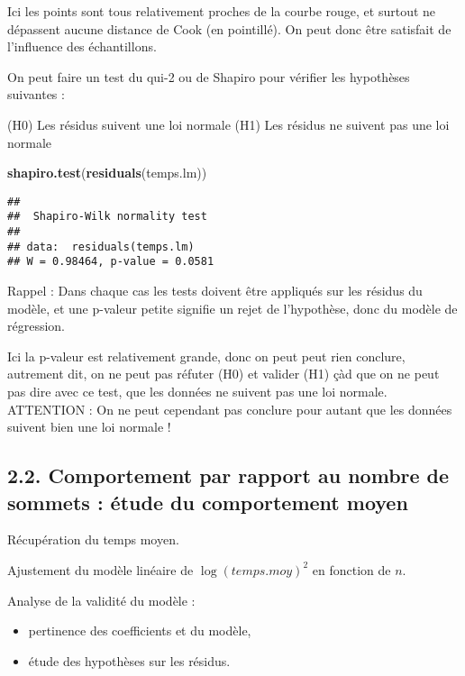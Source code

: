 \documentclass[
]{article}
\newenvironment{Shaded}{\begin{snugshade}}{\end{snugshade}}
\newcommand{\KeywordTok}[1]{\textcolor[rgb]{0.13,0.29,0.53}{\textbf{#1}}}
\newcommand{\NormalTok}[1]{#1}
\begin{document}
Ici les points sont tous relativement proches de la courbe rouge, et
surtout ne dépassent aucune distance de Cook (en pointillé). On peut
donc être satisfait de l'influence des échantillons.

On peut faire un test du qui-2 ou de Shapiro pour vérifier les
hypothèses suivantes :

(H0) Les résidus suivent une loi normale (H1) Les résidus ne suivent pas
une loi normale

\begin{Shaded}
\begin{Highlighting}[]
\KeywordTok{shapiro.test}\NormalTok{(}\KeywordTok{residuals}\NormalTok{(temps.lm))}
\end{Highlighting}
\end{Shaded}

\begin{verbatim}
## 
##  Shapiro-Wilk normality test
## 
## data:  residuals(temps.lm)
## W = 0.98464, p-value = 0.0581
\end{verbatim}

Rappel : Dans chaque cas les tests doivent être appliqués sur les
résidus du modèle, et une p-valeur petite signifie un rejet de
l'hypothèse, donc du modèle de régression.

Ici la p-valeur est relativement grande, donc on peut peut rien
conclure, autrement dit, on ne peut pas réfuter (H0) et valider (H1) çàd
que on ne peut pas dire avec ce test, que les données ne suivent pas une
loi normale. ATTENTION : On ne peut cependant pas conclure pour autant
que les données suivent bien une loi normale !

\hypertarget{comportement-par-rapport-au-nombre-de-sommets-uxe9tude-du-comportement-moyen}{%
\subsection{2.2. Comportement par rapport au nombre de sommets : étude
du comportement
moyen}\label{comportement-par-rapport-au-nombre-de-sommets-uxe9tude-du-comportement-moyen}}

Récupération du temps moyen.

Ajustement du modèle linéaire de \(\log(temps.moy)^2\) en fonction de
\(n\).

Analyse de la validité du modèle :

\begin{itemize}
\item
  pertinence des coefficients et du modèle,
\item
  étude des hypothèses sur les résidus.
\end{itemize}
\end{document}
